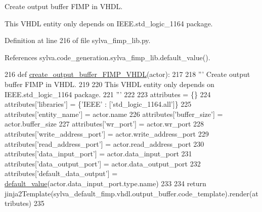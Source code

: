 \begin{DoxyVerb}Create output buffer FIMP in VHDL.

This VHDL entity only depends on IEEE.std_logic_1164 package.
\end{DoxyVerb}
 

Definition at line 216 of file sylva\+\_\+fimp\+\_\+lib.\+py.



References sylva.\+code\+\_\+generation.\+sylva\+\_\+fimp\+\_\+lib.\+default\+\_\+value().


\begin{DoxyCode}
216   \textcolor{keyword}{def }\hyperlink{namespacesylva_1_1code__generation_1_1sylva__fimp__lib_a66cabf05c0d2dc8b7957560a0075b5d8}{create\_output\_buffer\_FIMP\_VHDL}(actor):
217 
218     \textcolor{stringliteral}{''' Create output buffer FIMP in VHDL.}
219 \textcolor{stringliteral}{}
220 \textcolor{stringliteral}{    This VHDL entity only depends on IEEE.std\_logic\_1164 package.}
221 \textcolor{stringliteral}{    '''}
222 
223     attributes = \{\}
224     attributes[\textcolor{stringliteral}{'libraries'}] = \{\textcolor{stringliteral}{'IEEE'} : [\textcolor{stringliteral}{'std\_logic\_1164.all'}]\}
225     attributes[\textcolor{stringliteral}{'entity\_name'}] = actor.name
226     attributes[\textcolor{stringliteral}{'buffer\_size'}] = actor.buffer\_size
227     attributes[\textcolor{stringliteral}{'wr\_port'}] = actor.wr\_port
228     attributes[\textcolor{stringliteral}{'write\_address\_port'}] = actor.write\_address\_port
229     attributes[\textcolor{stringliteral}{'read\_address\_port'}] = actor.read\_address\_port
230     attributes[\textcolor{stringliteral}{'data\_input\_port'}] = actor.data\_input\_port
231     attributes[\textcolor{stringliteral}{'data\_output\_port'}] = actor.data\_output\_port
232     attributes[\textcolor{stringliteral}{'default\_data\_output'}] = \hyperlink{namespacesylva_1_1code__generation_1_1sylva__fimp__lib_a7ade6c6728b5e51bbbbfef039fc718cc}{default\_value}(actor.data\_input\_port.type.name)
233 
234     \textcolor{keywordflow}{return} jinja2Template(sylva\_default\_fimp.vhdl.output\_buffer.code\_template).render(attributes)
235 
\end{DoxyCode}
\mbox{\label{namespacesylva_1_1code__generation_1_1sylva__fimp__lib_ac6074b6b55425f68674b21fa5feef173}} 
